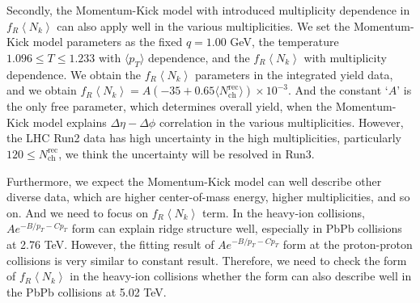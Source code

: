 \documentclass[jkps,fleqn,showpacs,showkeys]{revtex4}
\begin{document}
Secondly, the Momentum-Kick model with introduced multiplicity dependence in $f_R\left\langle N_k\right\rangle$ can also apply well in the various multiplicities.
We set the Momentum-Kick model parameters as the fixed $q=1.00$ GeV, the temperature $1.096\leq T \leq 1.233$ with $\langle p_T \rangle$ dependence, and the $f_R\left\langle N_k \right\rangle$ with multiplicity dependence.
We obtain the $f_R\left\langle N_k \right\rangle$ parameters in the integrated yield data, and we obtain $f_R\left\langle N_k \right\rangle = A(-35+0.65\langle N_{\text{ch}}^{\text{rec}}\rangle)\times10^{-3}$.
And the constant `$A$' is the only free parameter, which determines overall yield, when the Momentum-Kick model explains $\Delta\eta-\Delta\phi$ correlation in the various multiplicities.
However, the LHC Run2 data has high uncertainty in the high multiplicities, particularly $120\leq N_{\text{ch}}^{\text{rec}}$, we think the uncertainty will be resolved in Run3.





Furthermore, we expect the Momentum-Kick model can well describe other diverse data, which are higher center-of-mass energy, higher multiplicities, and so on.
And we need to focus on $f_R\left\langle N_k \right\rangle$ term.
In the heavy-ion collisions, $Ae^{-{B} / p_T -C p_{T}}$ form can explain ridge structure well, especially in PbPb collisions at 2.76 TeV.
However, the fitting result of $Ae^{-{B} / p_T -C p_{T}}$ form at the proton-proton collisions is very similar to constant result.
Therefore, we need to check the form of $f_R\left\langle N_k \right\rangle$ in the heavy-ion collisions whether the form can also describe well in the PbPb collisions at 5.02 TeV.



\end{document}
